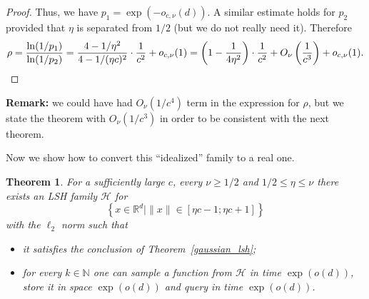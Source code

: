 \documentclass[11pt,letterpaper]{article}
\newtheorem{theorem}{Theorem}
\newcommand{\set}[1]{\left\{#1\right\}}
\newcommand{\Nbb}{\mathbb{N}}
\newcommand{\Rbb}{\mathbb{R}}
\begin{document}
\begin{proof}
    Thus, we have $p_1 = \exp(-o_{c, \nu}(d))$. A similar estimate holds for $p_2$ provided that $\eta$ is
    separated from $1/2$ (but we do not really need it). Therefore
    $$
        \rho = \frac{\ln(1 / p_1)}{\ln(1 / p_2)} = \frac{4 - 1 / \eta^2}{4 - 1 / (\eta c)^2} \cdot \frac{1}{c^2} + o_{c, \nu}(1) \\= \left(1 - \frac{1}{4 \eta^2}\right) \cdot \frac{1}{c^2} + O_{\nu}\left(\frac{1}{c^3}\right) + o_{c,\nu}(1).
    $$
\end{proof}
\textbf{Remark:} we could have had $O_{\nu}(1 / c^4)$ term in the expression for $\rho$, but we state the theorem
with $O_{\nu}(1 / c^3)$ in order to be consistent with the next theorem.

Now we show how to convert this ``idealized'' family to a real one.

\begin{theorem}
    \label{non_ideal_gaussian_lsh}
    For a sufficiently large $c$, every $\nu \geq 1/2$ and $1/2 \leq \eta \leq \nu$
    there exists an LSH family $\mathcal{H}$ for
    $$
        \set{x \in \Rbb^d \mid \|x\| \in [\eta c - 1; \eta c + 1]}
    $$
    with the $\ell_2$ norm such that
    \begin{itemize}
        \item it satisfies the conclusion of Theorem~\ref{gaussian_lsh};
        \item for every $k \in \Nbb$ one can sample a function from $\mathcal{H}$
        in time $\exp(o(d))$,
        store it in space $\exp(o(d))$ and query in time
        $\exp(o(d))$.
    \end{itemize}
\end{theorem}
\end{document}
